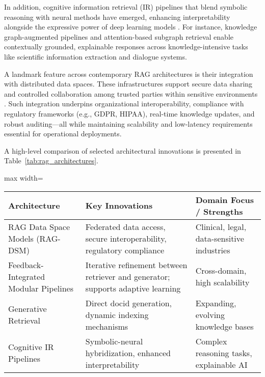 \documentclass[sigconf]{acmart}
\begin{document}
In addition, cognitive information retrieval (IR) pipelines that blend symbolic reasoning with neural methods have emerged, enhancing interpretability alongside the expressive power of deep learning models \cite{ref31,ref37,ref47}. For instance, knowledge graph-augmented pipelines and attention-based subgraph retrieval enable contextually grounded, explainable responses across knowledge-intensive tasks like scientific information extraction and dialogue systems.

A landmark feature across contemporary RAG architectures is their integration with distributed data spaces. These infrastructures support secure data sharing and controlled collaboration among trusted parties within sensitive environments \cite{ref64}. Such integration underpins organizational interoperability, compliance with regulatory frameworks (e.g., GDPR, HIPAA), real-time knowledge updates, and robust auditing—all while maintaining scalability and low-latency requirements essential for operational deployments.

A high-level comparison of selected architectural innovations is presented in Table~\ref{tab:rag_architectures}.

\begin{table*}[htbp]
\centering
\caption{Notable RAG architectural innovations and their domain strengths.}
\label{tab:rag_architectures}
\begin{adjustbox}{max width=\textwidth}
\begin{tabular}{lll}
\toprule
\textbf{Architecture} & \textbf{Key Innovations} & \textbf{Domain Focus / Strengths} \\
\midrule
RAG Data Space Models (RAG-DSM) & Federated data access, secure interoperability, regulatory compliance & Clinical, legal, data-sensitive industries \\
Feedback-Integrated Modular Pipelines & Iterative refinement between retriever and generator; supports adaptive learning & Cross-domain, high scalability \\
Generative Retrieval & Direct docid generation, dynamic indexing mechanisms & Expanding, evolving knowledge bases \\
Cognitive IR Pipelines & Symbolic-neural hybridization, enhanced interpretability & Complex reasoning tasks, explainable AI \\
\bottomrule
\end{tabular}
\end{adjustbox}
\end{table*}
\end{document}

